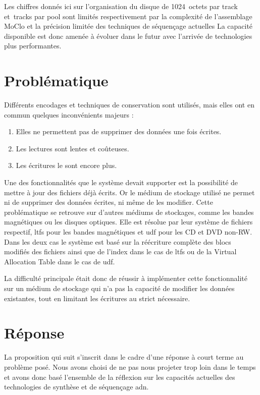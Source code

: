 \documentclass[a4paper]{report}
\begin{document}
Les chiffres donnés ici sur l’organisation du disque de 1024~octets par track et~tracks par pool sont limités respectivement par la complexité de l'assemblage MoClo et la précision limitée des techniques de séquençage actuelles
La capacité disponible est donc amenée à évoluer dans le futur avec l'arrivée de technologies plus performantes.

\section{Problématique}

Différents encodages et techniques de conservation sont utilisés, mais elles ont en commun quelques inconvénients majeurs :

\begin{enumerate}
  \item Elles ne permettent pas de supprimer des données une fois écrites.
  \item Les lectures sont lentes et coûteuses.
  \item Les écritures le sont encore plus.
\end{enumerate}

Une des fonctionnalités que le système devait supporter est la possibilité de mettre à jour des fichiers déjà écrits.
Or le médium de stockage utilisé ne permet ni de supprimer des données écrites, ni même de les modifier.
Cette problématique se retrouve sur d'autres médiums de stockages, comme les bandes magnétiques ou les disques optiques.
Elle est résolue par leur système de fichiers respectif, \ac{ltfs} \cite{pease2010linear} pour les bandes magnétiques et \ac{udf} \cite{optical2003universal} pour les CD et DVD non-RW.
Dans les deux cas le système est basé sur la réécriture complète des blocs modifiés des fichiers ainsi que de l'index dans le cas de \ac{ltfs} ou de la Virtual Allocation Table dans le cas de \ac{udf}.


La difficulté principale était donc de réussir à implémenter cette fonctionnalité sur un médium de stockage qui n'a pas la capacité de modifier les données existantes, tout en limitant les écritures au strict nécessaire.


\section{Réponse}

La proposition qui suit s'inscrit dans le cadre d'une réponse à court terme au problème posé.
Nous avons choisi de ne pas nous projeter trop loin dans le temps et avons donc basé l'ensemble de la réflexion sur les capacités actuelles des technologies de synthèse et de séquençage \ac{adn}.
\end{document}
